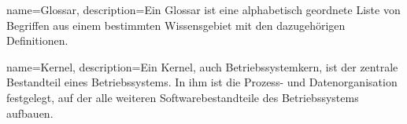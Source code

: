 
{
	name=Glossar,
	description={Ein Glossar ist eine alphabetisch geordnete Liste von Begriffen aus einem bestimmten Wissensgebiet mit den dazugehörigen Definitionen.}
}

{
	name=Kernel,
	description={Ein Kernel, auch Betriebssystemkern, ist der zentrale Bestandteil eines Betriebssystems. In ihm ist die Prozess- und Datenorganisation festgelegt, auf der alle weiteren Softwarebestandteile des Betriebssystems aufbauen.}
}
